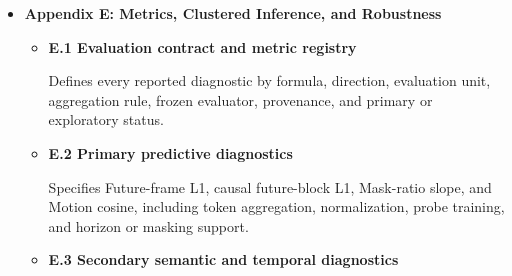 \begin{itemize}
\begin{itemize}
    \item \textbf{D.2 Architecture \(\times\) structured-supervision
    factorial}

    Compares matched monolithic and factorized predictors with and
    without automatically derived structured supervision, isolating
    architecture, supervision, and their interaction.

    \item \textbf{D.3 Factor pathways and objective ablations}

    Tests factor-view ablations across the layout, agent, and
    interaction views through controlled one-factor removals.

    \item \textbf{D.4 Falsification controls and sensitivity}

    Evaluates temporally misaligned and clip-shuffled teacher targets,
    reliability weighting, factor ranks, and loss coefficients to
    distinguish structured information from generic regularization.

    \item \textbf{D.5 Attribution synthesis}

    Consolidates the factorial contrasts and component ablations,
    reporting which mechanisms account for each prediction,
    visibility, interaction, motion, and RGB result.

\end{itemize}

\item \textbf{Appendix E: Metrics, Clustered Inference, and Robustness}
\begin{itemize}

    \item \textbf{E.1 Evaluation contract and metric registry}

    Defines every reported diagnostic by formula, direction, evaluation
    unit, aggregation rule, frozen evaluator, provenance, and
    primary or exploratory status.

    \item \textbf{E.2 Primary predictive diagnostics}

    Specifies Future-frame L1, causal future-block L1,
    Mask-ratio slope, and Motion cosine, including token aggregation,
    normalization, probe training, and horizon or masking support.

    \item \textbf{E.3 Secondary semantic and temporal diagnostics}


\end{itemize}
\end{itemize}
